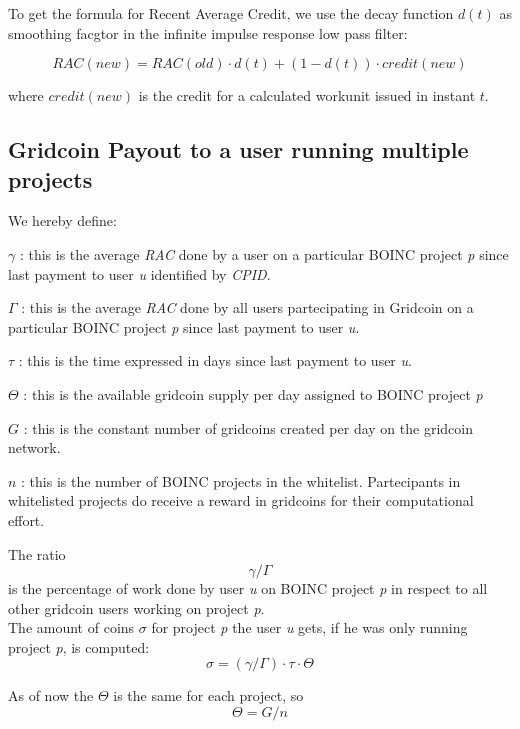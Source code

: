 To get the formula for Recent Average Credit, we use the decay function $d(t)$ as smoothing facgtor in the infinite impulse response low pass filter:

\begin{equation}
RAC(new) = RAC(old) \cdot d(t) + (1-d(t)) \cdot credit(new)
\end{equation}

where $credit(new)$ is the credit for a calculated workunit issued in instant $t$.

\subsection{Gridcoin Payout to a user running multiple projects}

We hereby define:
\begin{description}
  \item{$\gamma$} : this is the average \textit{RAC} done by a user on a particular BOINC project \textit{p} since last payment to user \textit{u} identified by \textit{CPID}.
  \item{$\Gamma$} : this is the average \textit{RAC} done by all users partecipating in Gridcoin on a particular BOINC project \textit{p} since last payment to user \textit{u}.
  \item{$\tau$} : this is the time expressed in days since last payment to user \textit{u}.
  \item{$\Theta$} : this is the available gridcoin supply per day assigned to BOINC project \textit{p}
  \item{$G$} : this is the constant number of gridcoins created per day on the gridcoin network. 
  \item{$n$} : this is the number of BOINC projects in the whitelist. Partecipants in whitelisted projects do receive a reward in gridcoins for their computational effort.  
\end{description}

The ratio
\[\gamma/\Gamma\]
is the percentage of work done by user \textit{u} on BOINC project \textit{p} in respect to all other gridcoin users working on project \textit{p}.\\

The amount of coins $\sigma$ for project \textit{p} the user \textit{u} gets, if he was only running project \textit{p}, is computed:
\[ \sigma = (\gamma / \Gamma) \cdot \tau \cdot \Theta \]

As of now the $\Theta$ is the same for each project, so
\[ \Theta = G/n \]

